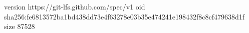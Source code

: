 version https://git-lfs.github.com/spec/v1
oid sha256:fe6813572ba1bd438dd73e4f63278e03b35e474241e198432f8c8cf479638d1f
size 87528
